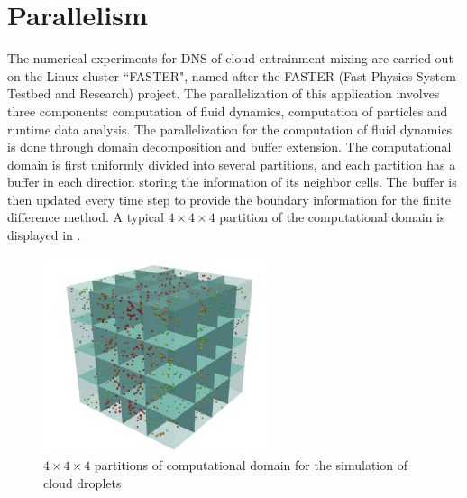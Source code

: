 \section{Parallelism}
The numerical experiments for DNS of cloud entrainment mixing are carried out on the Linux cluster ``FASTER", named after the FASTER (Fast-Physics-System-Testbed and Research) project. The parallelization of this application involves three components: computation of fluid dynamics, computation of particles and runtime data analysis. The parallelization for the computation of fluid dynamics is done through domain decomposition and buffer extension. The computational domain is first uniformly divided into several partitions, and each partition has a buffer in each direction storing the information of its neighbor cells. The buffer is then updated every time step to provide the boundary information for the finite difference method. A typical $4\times 4\times 4$ partition of the computational domain is displayed in . 

\begin{figure}[!htbp] \centering
\includegraphics[width=0.6\textwidth]{Figures/droplets_parallel.jpg}
\caption{$4\times 4\times 4$ partitions of computational domain for the simulation of 
cloud droplets\label{fig:droplets_parallel}} 
\end{figure}

